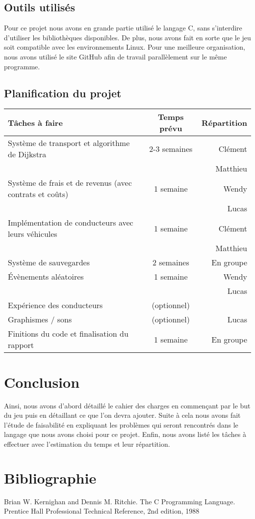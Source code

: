 \documentclass[a4paper, 12pt]{article}
\begin{document}
      \subsection{Outils utilisés}
         Pour ce projet nous avons en grande partie utilisé le langage C, sans s'interdire d'utiliser les bibliothèques disponibles. De plus, nous avons fait en sorte que le jeu soit compatible avec les environnements Linux. Pour une meilleure organisation, nous avons utilisé le site GitHub afin de travail parallèlement sur le même programme.
    \subsection{Planification du projet}
        
 \begin{tabular}{|l|c|r|}
  \hline
  Tâches à faire & Temps prévu & Répartition \\
  \hline
  Système de transport et algorithme de Dijkstra & 2-3 semaines & Clément\\
  && Matthieu\\
  \hline
  Système de frais et de revenus (avec contrats et coûts)  & 1 semaine & Wendy \\
  && Lucas\\
  \hline
  Implémentation de conducteurs avec leurs véhicules  & 1 semaine & Clément\\
  && Matthieu \\
  \hline
  Système de sauvegardes & 2 semaines & En groupe \\
  \hline
  Évènements aléatoires & 1 semaine & Wendy \\ 
  && Lucas \\
  \hline
  Expérience des conducteurs & (optionnel) & \\
  \hline
  Graphismes / sons & (optionnel) & Lucas \\
  \hline
  Finitions du code et finalisation du rapport  & 1 semaine & En groupe \\
  \hline
\end{tabular}

 \newpage
 
\section*{}

\section*{Conclusion}
      Ainsi, nous avons d'abord détaillé le cahier des charges en commençant par le but du jeu puis en détaillant ce que l'on devra ajouter. Suite à cela nous avons fait l'étude de faisabilité en expliquant les problèmes qui seront rencontrés dans le langage que nous avons choisi pour ce projet. Enfin, nous avons listé les tâches à effectuer avec l'estimation du temps et leur répartition.

\section*{Bibliographie}
       Brian W. Kernighan and Dennis M. Ritchie. The C Programming Language. Prentice Hall Professional Technical Reference, 2nd edition, 1988
\end{document}
